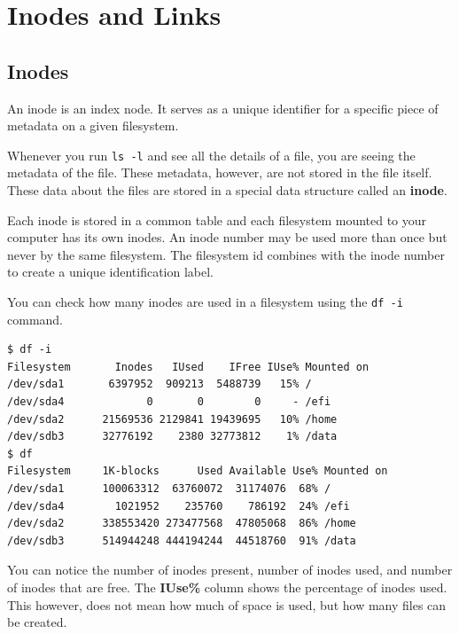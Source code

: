 
\vfill
\pagebreak
\section{Inodes and Links}

\subsection{Inodes}

\begin{definition}[Inodes]
  An inode is an index node.
  It serves as a unique identifier for a specific piece of metadata on a given filesystem.
\end{definition}

Whenever you run \texttt{ls -l} and see all the details of a file, you are seeing the metadata of the file.
These metadata, however, are not stored in the file itself.
These data about the files are stored in a special data structure called an \textbf{inode}.

Each inode is stored in a common table and each filesystem mounted to your computer has its own inodes.
An inode number may be used more than once but never by the same filesystem.
The filesystem id combines with the inode number to create a unique identification label.

You can check how many inodes are used in a filesystem using the \texttt{df -i} command.

\begin{lstlisting}
$ df -i
Filesystem       Inodes   IUsed    IFree IUse% Mounted on
/dev/sda1       6397952  909213  5488739   15% /
/dev/sda4             0       0        0     - /efi
/dev/sda2      21569536 2129841 19439695   10% /home
/dev/sdb3      32776192    2380 32773812    1% /data
$ df
Filesystem     1K-blocks      Used Available Use% Mounted on
/dev/sda1      100063312  63760072  31174076  68% /
/dev/sda4        1021952    235760    786192  24% /efi
/dev/sda2      338553420 273477568  47805068  86% /home
/dev/sdb3      514944248 444194244  44518760  91% /data
\end{lstlisting}

You can notice the number of inodes present, number of inodes used, and number of inodes that are free.
The \textbf{IUse\%} column shows the percentage of inodes used.
This however, does not mean how much of space is used, but how many files can be created.

